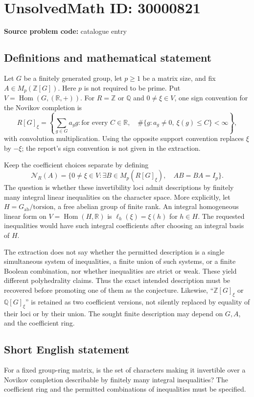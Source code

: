 \documentclass[11pt]{article}
\newcommand{\Z}{\mathbb{Z}}
\newcommand{\Q}{\mathbb{Q}}
\newcommand{\R}{\mathbb{R}}
\begin{document}
\section*{UnsolvedMath ID: 30000821}
\textbf{Source problem code:} catalogue entry
\subsection{Definitions and mathematical statement}
Let \(G\) be a finitely generated group, let \(p\geq1\) be a matrix size, and fix \(A\in M_p(\Z[G])\). Here \(p\) is not required to be prime. Put \(V=\operatorname{Hom}(G,(\R,+))\). For \(R=\Z\) or \(\Q\) and \(0\ne\xi\in V\), one sign convention for the Novikov completion is
\[
R[G]_\xi=\left\{\sum_{g\in G}a_g g:
\text{for every }C\in\R,\quad
\#\{g:a_g\ne0,\ \xi(g)\leq C\}<\infty\right\},
\]
with convolution multiplication. Using the opposite support convention replaces \(\xi\) by \(-\xi\); the report's sign convention is not given in the extraction.

Keep the coefficient choices separate by defining
\[
\mathcal N_R(A)=\{0\ne\xi\in V:
\exists B\in M_p(R[G]_\xi),\quad AB=BA=I_p\}.
\]
The question is whether these invertibility loci admit descriptions by finitely many integral linear inequalities on the character space. More explicitly, let \(H=G_{\mathrm{ab}}/\text{torsion}\), a free abelian group of finite rank. An integral homogeneous linear form on \(V=\operatorname{Hom}(H,\R)\) is \(\ell_h(\xi)=\xi(h)\) for \(h\in H\). The requested inequalities would have such integral coefficients after choosing an integral basis of \(H\).

The extraction does not say whether the permitted description is a single simultaneous system of inequalities, a finite union of such systems, or a finite Boolean combination, nor whether inequalities are strict or weak. These yield different polyhedrality claims. Thus the exact intended description must be recovered before promoting one of them as the conjecture. Likewise, ``\(\Z[G]_\xi\) or \(\Q[G]_\xi\)'' is retained as two coefficient versions, not silently replaced by equality of their loci or by their union. The sought finite description may depend on \(G,A\), and the coefficient ring.
\subsection{Short English statement}
For a fixed group-ring matrix, is the set of characters making it invertible over a Novikov completion describable by finitely many integral inequalities? The coefficient ring and the permitted combinations of inequalities must be specified.
\end{document}
